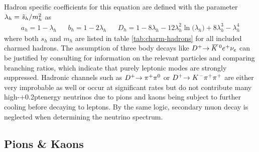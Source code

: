 Hadron specific coefficients for this equation are defined with the parameter
$\lambda_h = \kern+0.5pt \tilde{s}_h / m_h^2 \kern+0.2pt$ as
\begin{align*}
	a_h = 1 - \lambda_h && b_h = 1 - 2\lambda_h &&
	D_h = 1 - 8 \lambda_h - 12\lambda_h^2 \ln \bigl( \lambda_h \bigr) + 8 \lambda_h^3 - \lambda_h^4
\end{align*}
where both $s_h$ and $m_h$ are listed in table \ref{tab:charm-hadrons} for all included charmed hadrons. The assumption of three
body decays like $D^+ \kern-2.5pt \rightarrow \kern+1.0pt \overline{\kern-1.5pt K \kern+1.0pt}\kern+1.0pt^0 e^+ \nu_e$ can
be justified by consulting \cite{pdg} for information on the relevant particles and comparing branching ratios, which indicate
that purely leptonic modes are strongly suppressed. Hadronic channels such as $D^+ \kern-2.5pt \rightarrow \pi^+ \pi^0$ or
$D^+ \kern-2.5pt \rightarrow K^{\kern+0.5pt -} \pi^+ \pi^+$ are either very improbable as well or occur at significant rates but
do not contribute many high-{\kern+0.2pt}energy neutrinos due to pions and kaons being subject to further cooling before decaying
to leptons. By the same logic, secondary muon decay is neglected when determining the neutrino spectrum.

\newpage





\subsection{Pions \& Kaons}
\label{sub:pions}

